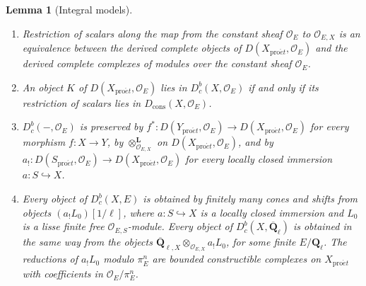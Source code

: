 \documentclass[11pt,a4paper]{article}
\numberwithin{equation}{section}
\newtheorem{lemma}[theorem]{Lemma}
\theoremstyle{definition}
\theoremstyle{remark}
\newcommand{\D}{D}
\newcommand{\Dbc}{D^b_c}
\newcommand{\Qbar}{\overline{\mathbf Q}_\ell}
\newcommand{\Ql}{\mathbf Q_\ell}
\newcommand{\proet}{\mathrm{pro}\acute{e}t}
\newcommand{\Dc}{D_{\mathrm{cons}}}
\newcommand{\QbarX}{\overline{\mathbf Q}_{\ell,X}}
\begin{document}
\begin{lemma}[Integral models]
\label{b:lem:integral-models}
\leavevmode
\begin{enumerate}
\item Restriction of scalars along the map from the constant sheaf
  $\mathcal O_E$ to $\mathcal O_{E,X}$ is an equivalence between the
  derived complete objects of $\D(X_{\proet},\mathcal O_E)$ and the derived
  complete complexes of modules over the constant sheaf $\mathcal O_E$.
\item An object $K$ of $\D(X_{\proet},\mathcal O_E)$ lies in
  $\Dbc(X,\mathcal O_E)$ if and only if its restriction of scalars lies in
  $\Dc(X,\mathcal O_E)$.
\item $\Dbc(-,\mathcal O_E)$ is preserved by
  $f^*\colon\D(Y_{\proet},\mathcal O_E)\to\D(X_{\proet},\mathcal O_E)$
  for every morphism $f:X\to Y$, by
  $\otimes^{\mathbf L}_{\mathcal O_{E,X}}$ on $\D(X_{\proet},\mathcal O_E)$,
  and by
  $a_!\colon\D(S_{\proet},\mathcal O_E)\to\D(X_{\proet},\mathcal O_E)$ for
  every locally closed immersion $a:S\hookrightarrow X$.
\item Every object of $\Dbc(X,E)$ is obtained by finitely many cones and
  shifts from objects $(a_!L_0)[1/\ell]$, where $a:S\hookrightarrow X$ is
  a locally closed immersion and $L_0$ is a lisse finite free
  $\mathcal O_{E,S}$-module. Every object of $\Dbc(X,\Qbar)$ is obtained in
  the same way from the objects $\QbarX\otimes_{\mathcal O_{E,X}}a_!L_0$,
  for some finite $E/\Ql$. The reductions of $a_!L_0$ modulo $\pi_E^n$ are
  bounded constructible complexes on $X_{\proet}$ with coefficients
  in $\mathcal O_E/\pi_E^n$.
\end{enumerate}
\end{lemma}
\end{document}
